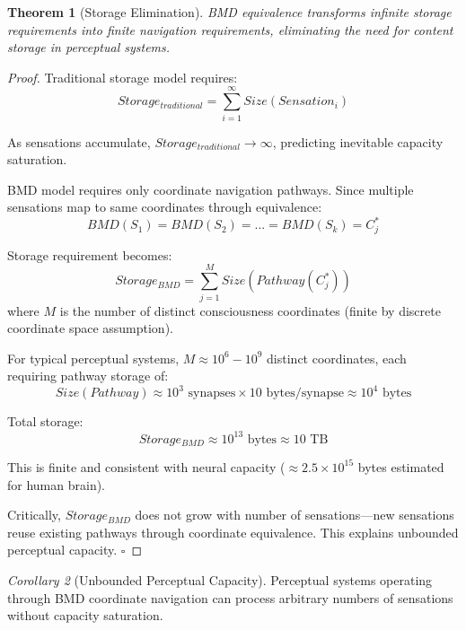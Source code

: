 \documentclass[12pt]{article}
\newtheorem{theorem}{Theorem}[section]
\newtheorem{corollary}[theorem]{Corollary}
\theoremstyle{definition}
\theoremstyle{remark}
\newtheorem{corollary}[theorem]{Corollary}
\begin{document}
\begin{theorem}[Storage Elimination]
\label{thm:storage_elimination}
BMD equivalence transforms infinite storage requirements into finite navigation requirements, eliminating the need for content storage in perceptual systems.
\end{theorem}

\begin{proof}
Traditional storage model requires:
\begin{equation}
Storage_{traditional} = \sum_{i=1}^{\infty} Size(Sensation_i)
\end{equation}

As sensations accumulate, $Storage_{traditional} \rightarrow \infty$, predicting inevitable capacity saturation.

BMD model requires only coordinate navigation pathways. Since multiple sensations map to same coordinates through equivalence:
\begin{equation}
BMD(S_1) = BMD(S_2) = ... = BMD(S_k) = C_j^*
\end{equation}

Storage requirement becomes:
\begin{equation}
Storage_{BMD} = \sum_{j=1}^{M} Size(Pathway(C_j^*))
\end{equation}
where $M$ is the number of distinct consciousness coordinates (finite by discrete coordinate space assumption).

For typical perceptual systems, $M \approx 10^6 - 10^9$ distinct coordinates, each requiring pathway storage of:
\begin{equation}
Size(Pathway) \approx 10^3 \text{ synapses} \times 10 \text{ bytes/synapse} \approx 10^4 \text{ bytes}
\end{equation}

Total storage:
\begin{equation}
Storage_{BMD} \approx 10^{13} \text{ bytes} \approx 10 \text{ TB}
\end{equation}

This is finite and consistent with neural capacity ($\approx 2.5 \times 10^{15}$ bytes estimated for human brain).

Critically, $Storage_{BMD}$ does not grow with number of sensations—new sensations reuse existing pathways through coordinate equivalence. This explains unbounded perceptual capacity. $\square$
\end{proof}

\begin{corollary}[Unbounded Perceptual Capacity]
\label{thm:unbounded_capacity}
Perceptual systems operating through BMD coordinate navigation can process arbitrary numbers of sensations without capacity saturation.
\end{corollary}
\end{document}
